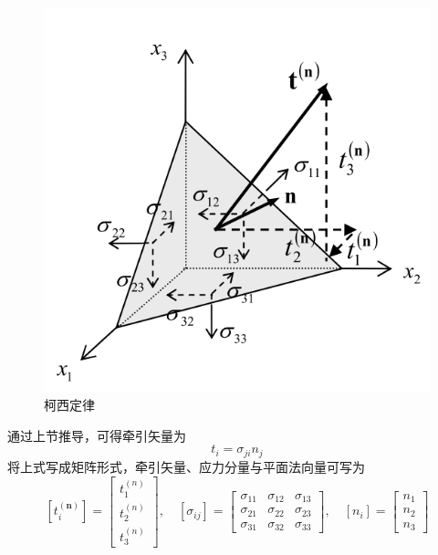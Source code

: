 \documentclass[12pt, a4paper]{ctexart}
\begin{document}
\begin{figure}
	\centering
	\includegraphics[scale=0.8]{24.png}
	\caption{柯西定律}
	\label{fig24}
\end{figure}

通过上节推导，可得牵引矢量为
\begin{equation}
t_{i}=\sigma_{j i} n_{j}
\end{equation}
将上式写成矩阵形式，牵引矢量、应力分量与平面法向量可写为
\begin{equation}\label{eq2}
\left[t_{i}^{(\mathbf{n})}\right]=\left[ \begin{array}{c}{t_{1}^{(n)}} \\ {t_{2}^{(n)}} \\ {t_{3}^{(n)}}\end{array}\right], \quad\left[\sigma_{i j}\right]=\left[ \begin{array}{ccc}{\sigma_{11}} & {\sigma_{12}} & {\sigma_{13}} \\ {\sigma_{21}} & {\sigma_{22}} & {\sigma_{23}} \\ {\sigma_{31}} & {\sigma_{32}} & {\sigma_{33}}\end{array}\right], \quad\left[n_{i}\right]=\left[ \begin{array}{c}{n_{1}} \\ {n_{2}} \\ {n_{3}}\end{array}\right]
\end{equation}
\end{document}
